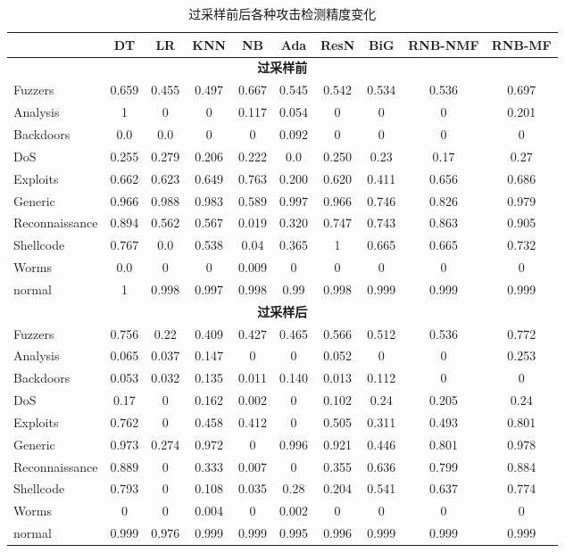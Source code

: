 \begin{table}[htbp]
  \centering
  \caption{过采样前后各种攻击检测精度变化}
  \label{tab:oversampling_performance}
  \begin{tabular}{lccccccccc}
  \toprule
  & DT & LR & KNN & NB & Ada & ResN & BiG & RNB-NMF & RNB-MF \\
  \midrule
  \multicolumn{10}{c}{\textbf{过采样前}} \\
  Fuzzers & 0.659 & 0.455 & 0.497 & 0.667 & 0.545 & 0.542 & 0.534 & 0.536 & 0.697 \\
  Analysis & 1 & 0 & 0 & 0.117 & 0.054 & 0 & 0 & 0 & 0.201 \\
  Backdoors & 0.0 & 0.0 & 0 & 0 & 0.092 & 0 & 0 & 0 & 0 \\
  DoS & 0.255 & 0.279 & 0.206 & 0.222 & 0.0 & 0.250 & 0.23 & 0.17 & 0.27 \\
  Exploits & 0.662 & 0.623 & 0.649 & 0.763 & 0.200 & 0.620 & 0.411 & 0.656 & 0.686 \\
  Generic & 0.966 & 0.988 & 0.983 & 0.589 & 0.997 & 0.966 & 0.746 & 0.826 & 0.979 \\
  Reconnaissance & 0.894 & 0.562 & 0.567 & 0.019 & 0.320 & 0.747 & 0.743 & 0.863 & 0.905 \\
  Shellcode & 0.767 & 0.0 & 0.538 & 0.04 & 0.365 & 1 & 0.665 & 0.665 & 0.732 \\
  Worms & 0.0 & 0 & 0 & 0.009 & 0 & 0 & 0 & 0 & 0 \\
  normal & 1 & 0.998 & 0.997 & 0.998 & 0.99 & 0.998 & 0.999 & 0.999 & 0.999 \\
  \midrule
  \multicolumn{10}{c}{\textbf{过采样后}} \\
  Fuzzers & 0.756 & 0.22 & 0.409 & 0.427 & 0.465 & 0.566 & 0.512 & 0.536 & 0.772 \\
  Analysis & 0.065 & 0.037 & 0.147 & 0 & 0 & 0.052 & 0 & 0 & 0.253 \\
  Backdoors & 0.053 & 0.032 & 0.135 & 0.011 & 0.140 & 0.013 & 0.112 & 0 & 0 \\
  DoS & 0.17 & 0 & 0.162 & 0.002 & 0 & 0.102 & 0.24 & 0.205 & 0.24 \\
  Exploits & 0.762 & 0 & 0.458 & 0.412 & 0 & 0.505 & 0.311 & 0.493 & 0.801 \\
  Generic & 0.973 & 0.274 & 0.972 & 0 & 0.996 & 0.921 & 0.446 & 0.801 & 0.978 \\
  Reconnaissance & 0.889 & 0 & 0.333 & 0.007 & 0 & 0.355 & 0.636 & 0.799 & 0.884 \\
  Shellcode & 0.793 & 0 & 0.108 & 0.035 & 0.28 & 0.204 & 0.541 & 0.637 & 0.774 \\
  Worms & 0 & 0 & 0.004 & 0 & 0.002 & 0 & 0 & 0 & 0 \\
  normal & 0.999 & 0.976 & 0.999 & 0.999 & 0.995 & 0.996 & 0.999 &0.999 & 0.999 \\
\bottomrule
\end{tabular}
\end{table}
